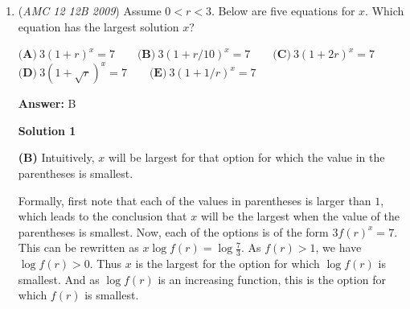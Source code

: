 \begin{enumerate}
 Since these areas are both equal, we set them equal to each other and solve for $c$. $(9-3c)/2 -1 = (9+3c)/2 -3$. $c$ is now solved to be $\frac{2}{3}$. $\boxed{\mathrm{(C)}}$.

 



\textbf{Solution 4 (Brute Force)}

We are looking for the area of the shaded region to be $\frac 52$. We start by testing $(A) \frac 12$. The area of the shaded region would be $\frac{(3-\frac 12)(3) }{2}-1=\frac {11}{4}$ when $c=\frac 12$. This does not match our wanted answer.

 We try $(B) \frac 35$ next. The area of the shaded region would be $\frac{(3-\frac 35)(3) }{2}-1=\frac {13}{5}$ when $c=\frac 35$. This also does not match our desired answer.

 We then try $(C) \frac 23$. The area of the shaded region would be $\frac{(3-\frac 23)(3) }{2}-1=\frac {5}{2}$ when $c=\frac 23$. Therefore, our answer is $\boxed{\mathrm{(C) \frac 23}}$.

 



\textbf{Solution 5}

Use the shoelace theorem to get the area of the unshaded portion in terms of a. Divide this area by the whole area which is 5. This fraction should be equal to $1/2$. You can easily solve for the answer from there.-mewto

 


	\item (\textit{AMC 12 12B 2009}) Assume $0 < r < 3$.  Below are five equations for $x$.  Which equation has the largest solution $x$?


 $\textbf{(A)}\ 3(1 + r)^x = 7\qquad \textbf{(B)}\ 3(1 + r/10)^x = 7\qquad \textbf{(C)}\ 3(1 + 2r)^x = 7$
$\textbf{(D)}\ 3(1 + \sqrt {r})^x = 7\qquad \textbf{(E)}\ 3(1 + 1/r)^x = 7$

 \textbf{Answer: }B



\textbf{Solution 1}

\textbf{(B)} Intuitively, $x$ will be largest for that option for which the value in the parentheses is smallest.

 Formally, first note that each of the values in parentheses is larger than $1$, which leads to the conclusion that $x$ will be the largest when the value of the parentheses is smallest. Now, each of the options is of the form $3f(r)^x = 7$. This can be rewritten as $x\log f(r) = \log\frac 73$. As $f(r)>1$, we have $\log f(r)>0$. Thus $x$ is the largest for the option for which $\log f(r)$ is smallest. And as $\log f(r)$ is an increasing function, this is the option for which $f(r)$ is smallest.


\end{enumerate}
